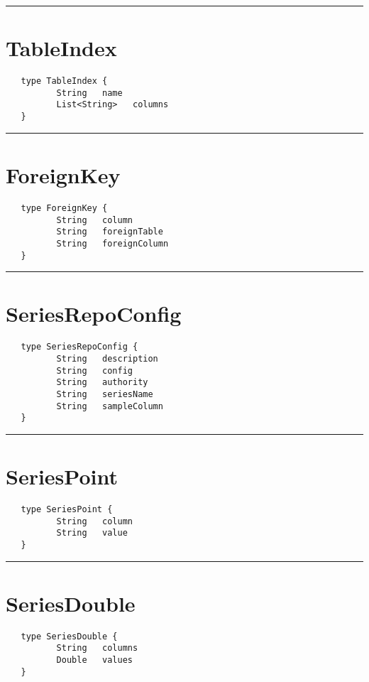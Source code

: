 \rule{12cm}{2pt}
\section{TableIndex}
\label{type:TableIndex}

\begin{Verbatim}
   type TableIndex {
          String   name
          List<String>   columns
   }
\end{Verbatim}

\rule{12cm}{2pt}
\section{ForeignKey}
\label{type:ForeignKey}

\begin{Verbatim}
   type ForeignKey {
          String   column
          String   foreignTable
          String   foreignColumn
   }
\end{Verbatim}

\rule{12cm}{2pt}
\section{SeriesRepoConfig}
\label{type:SeriesRepoConfig}

\begin{Verbatim}
   type SeriesRepoConfig {
          String   description
          String   config
          String   authority
          String   seriesName
          String   sampleColumn
   }
\end{Verbatim}

\rule{12cm}{2pt}
\section{SeriesPoint}
\label{type:SeriesPoint}

\begin{Verbatim}
   type SeriesPoint {
          String   column
          String   value
   }
\end{Verbatim}

\rule{12cm}{2pt}
\section{SeriesDouble}
\label{type:SeriesDouble}

\begin{Verbatim}
   type SeriesDouble {
          String   columns
          Double   values
   }
\end{Verbatim}

